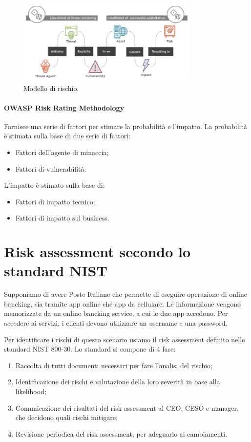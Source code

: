 \begin{figure}
    \centering
    \includegraphics[width=0.8\textwidth]{images/11-8.png}
    \caption{Modello di rischio.}
    \label{fig:11-4}
\end{figure}

\paragraph{OWASP Risk Rating Methodology} Fornisce una serie di fattori per stimare la probabilità e l'impatto. La probabilità è stimata sulla base di due serie di fattori:
\begin{itemize}
    \item Fattori dell'agente di minaccia;
    \item Fattori di vulnerabilità.
\end{itemize}
\noindent L'impatto è stimato sulla base di:
\begin{itemize}
    \item Fattori di impatto tecnico;
    \item Fattori di impatto sul business.
\end{itemize}

\section{Risk assessment secondo lo standard NIST}

Supponiamo di avere Poste Italiane che permette di eseguire operazione di online bancking, sia tramite app online che app da cellulare. Le informazione vengono memorizzate da un online bancking service, a cui le due app accedono. Per accedere ai servizi, i clienti devono utilizzare un username e una password.

Per identificare i rischi di questo scenario usiamo il risk assessment definito nello standard NIST 800-30. Lo standard si compone di 4 fase:
\begin{enumerate}
    \item Raccolta di tutti documenti necessari per fare l'analisi del rischio;
    \item Identificazione dei rischi e valutazione della loro severità in base alla likelihood;
    \item Comunicazione dei risultati del risk assessment al CEO, CESO e manager, che decidono quali rischi mitigare;
    \item Revisione periodica del risk assessment, per adeguarlo ai cambiamenti.
\end{enumerate}

